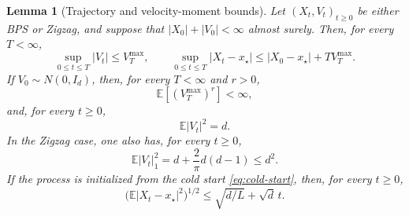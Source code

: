 \documentclass{amsart}
\theoremstyle{plain}
\newtheorem{lemma}[theorem]{Lemma}      %
\theoremstyle{definition}
\theoremstyle{remark}
\newcommand{\EE}{\mathbb{E}}
\newcommand{\abs}[1]{\lvert#1\rvert}
\newcommand{\E}{\EE}
\newcommand{\1}{\mathbf 1}
\begin{document}
\begin{lemma}[Trajectory and velocity-moment bounds]
\label{lem:trajectory}
Let $(X_t,V_t)_{t\ge0}$ be either BPS or Zigzag, and suppose that
$\abs{X_0}+\abs{V_0}<\infty$ almost surely.  Then, for every $T<\infty$,
\begin{equation}\label{eq:trajectory-bounds}
        \sup_{0\le t\le T}\abs{V_t}\le V_T^{\max},
        \qquad
        \sup_{0\le t\le T}\abs{X_t-x_\star}
        \le\abs{X_0-x_\star}+T V_T^{\max}.
\end{equation}
If $V_0\sim N(0,I_d)$, then, for every $T<\infty$ and $r>0$,
\begin{equation}\label{eq:vmax-moments}
        \E[(V_T^{\max})^r]<\infty,
\end{equation}
and, for every $t\ge0$,
\begin{equation}\label{eq:velocity-second-moment}
        \E\abs{V_t}^2=d.
\end{equation}
In the Zigzag case, one also has, for every $t\ge0$,
\begin{equation}\label{eq:zz-velocity-moments}
        \E\abs{V_t}_1^2
        =d+\frac{2}{\pi}d(d-1)\le d^2.
\end{equation}
If the process is initialized from the cold start \eqref{eq:cold-start}, then,
for every $t\ge0$,
\begin{equation}\label{eq:position-second-moment}
        \bigl(\E\abs{X_t-x_\star}^2\bigr)^{1/2}
        \le\sqrt{d/L}+\sqrt d\,t.
\end{equation}
\end{lemma}
\end{document}
